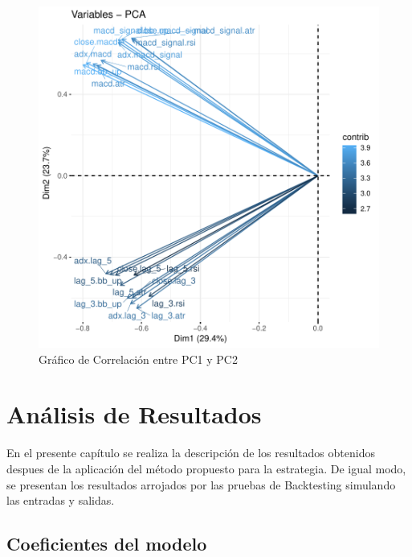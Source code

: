\documentclass[a4paper,12pt]{Latex/Classes/PhDthesisPSnPDF}
\begin{document}
\begin{figure}[H]
\centering
\includegraphics{main-011}
\caption{Gráfico de Correlación entre PC1 y PC2}
\end{figure}


\chapter{Análisis de Resultados}

En el presente capítulo se realiza la descripción de los resultados obtenidos despues de la aplicación del método propuesto para la estrategia. De igual modo, se presentan los resultados arrojados por las pruebas de Backtesting simulando las entradas y salidas.

\section{Coeficientes del modelo}
\end{document}
